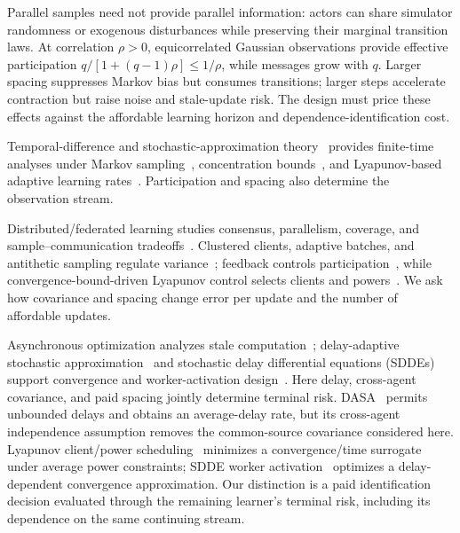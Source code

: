 \documentclass[journal]{IEEEtran}
\begin{document}
Parallel samples need not provide parallel information: actors can share simulator randomness or exogenous disturbances while preserving their marginal transition laws.
At correlation $\rho>0$, equicorrelated Gaussian observations provide effective participation $q/[1+(q-1)\rho]\le1/\rho$, while messages grow with $q$.
Larger spacing suppresses Markov bias but consumes transitions; larger steps accelerate contraction but raise noise and stale-update risk.
The design must price these effects against the affordable learning horizon and dependence-identification cost.

Temporal-difference and stochastic-approximation theory~\cite{sutton1988td,tsitsiklis1997td,robbins1951stochastic,polyak1992averaging} provides finite-time analyses under Markov sampling~\cite{bhandari2018finite,srikant2019finite,mou2022optimal}, concentration bounds~\cite{paulin2015concentration}, and Lyapunov-based adaptive learning rates~\cite{gupta2019adaptive}.
Participation and spacing also determine the observation stream.

Distributed/federated learning studies consensus, parallelism, coverage, and sample--communication tradeoffs~\cite{doan2019distributed,zhang2018decentralized,khodadadian2022federated,woo2023heterogeneity,salgia2024tradeoff,lan2023communication}.
Clustered clients, adaptive batches, and antithetic sampling regulate variance~\cite{fraboni2021clustered,de2017adaptive,ren2019antithetic}; feedback controls participation~\cite{cummins2025feedback}, while convergence-bound-driven Lyapunov control selects clients and powers~\cite{perazzone2025lyapunov}.
We ask how covariance and spacing change error per update and the number of affordable updates.

Asynchronous optimization analyzes stale computation~\cite{agarwal2011distributed,lian2015asynchronous,arjevani2020delayed}; delay-adaptive stochastic approximation~\cite{adibi2024delayed,dalfabbro2024dasa} and stochastic delay differential equations (SDDEs) support convergence and worker-activation design~\cite{yu2025sdde}.
Here delay, cross-agent covariance, and paid spacing jointly determine terminal risk.
DASA~\cite{dalfabbro2024dasa} permits unbounded delays and obtains an average-delay rate, but its cross-agent independence assumption removes the common-source covariance considered here.
Lyapunov client/power scheduling~\cite{perazzone2025lyapunov} minimizes a convergence/time surrogate under average power constraints; SDDE worker activation~\cite{yu2025sdde} optimizes a delay-dependent convergence approximation.
Our distinction is a paid identification decision evaluated through the remaining learner's terminal risk, including its dependence on the same continuing stream.
\end{document}
